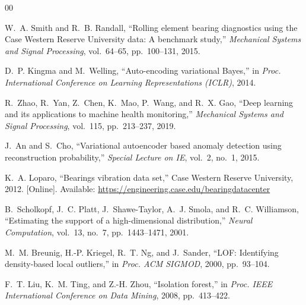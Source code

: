 \documentclass[conference,compsoc]{IEEEtran}
\begin{document}
\begin{thebibliography}{00}

W.~A. Smith and R.~B. Randall,
``Rolling element bearing diagnostics using the Case Western Reserve University data: A benchmark study,''
\textit{Mechanical Systems and Signal Processing}, vol.~64--65, pp.~100--131, 2015.

D.~P. Kingma and M.~Welling,
``Auto-encoding variational Bayes,''
in \textit{Proc. International Conference on Learning Representations (ICLR)}, 2014.

R.~Zhao, R.~Yan, Z.~Chen, K.~Mao, P.~Wang, and R.~X. Gao,
``Deep learning and its applications to machine health monitoring,''
\textit{Mechanical Systems and Signal Processing}, vol.~115, pp.~213--237, 2019.

J.~An and S.~Cho,
``Variational autoencoder based anomaly detection using reconstruction probability,''
\textit{Special Lecture on IE}, vol.~2, no.~1, 2015.

K.~A. Loparo,
``Bearings vibration data set,'' Case Western Reserve University, 2012.
[Online]. Available: \url{https://engineering.case.edu/bearingdatacenter}

B.~Scholkopf, J.~C. Platt, J.~Shawe-Taylor, A.~J. Smola, and R.~C. Williamson,
``Estimating the support of a high-dimensional distribution,''
\textit{Neural Computation}, vol.~13, no.~7, pp.~1443--1471, 2001.

M.~M. Breunig, H.-P. Kriegel, R.~T. Ng, and J.~Sander,
``LOF: Identifying density-based local outliers,''
in \textit{Proc. ACM SIGMOD}, 2000, pp.~93--104.

F.~T. Liu, K.~M. Ting, and Z.-H. Zhou,
``Isolation forest,''
in \textit{Proc. IEEE International Conference on Data Mining}, 2008, pp.~413--422.

\end{thebibliography}
\end{document}
